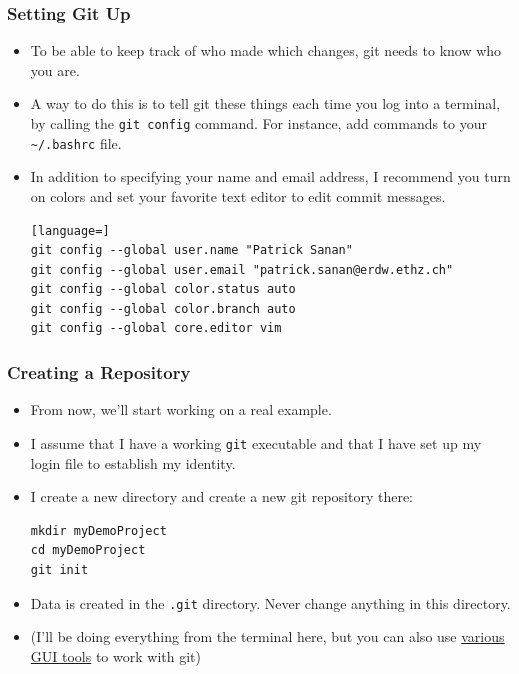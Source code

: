 \documentclass{beamer}
\begin{document}
\begin{frame}[fragile]
\frametitle{Setting Git Up}
\begin{itemize}
\item
To be able to keep track of who made which changes, git needs to know who you are.
\item 
A way to do this is to tell git these things each time you log into a terminal, by calling the \lstinline{git config} command. For instance, add commands to your \lstinline{~/.bashrc} file.
\item 
In addition to specifying your name and email address, I recommend you turn on colors and set your favorite text editor to edit commit messages.
\begin{lstlisting}[language=]
git config --global user.name "Patrick Sanan"
git config --global user.email "patrick.sanan@erdw.ethz.ch"
git config --global color.status auto
git config --global color.branch auto 
git config --global core.editor vim
\end{lstlisting}
\end{itemize}
\end{frame}

\begin{frame}[fragile]
\frametitle{Creating a Repository}
\begin{itemize}
\item From now, we'll start working on a real example. 
\item I assume that I have a working \lstinline{git} executable and that I have set up my login file to establish my identity.
\item I create a new directory and create a new git repository there:
\begin{lstlisting}[language=C++]
mkdir myDemoProject
cd myDemoProject
git init
\end{lstlisting}
\item Data is created in the \lstinline{.git} directory. Never change anything in this directory.
\item (I'll be doing everything from the terminal here, but you can also use \href{https://git-scm.com/downloads/guis}{various GUI tools} to work with git)
\end{itemize}
\end{frame}
\end{document}
